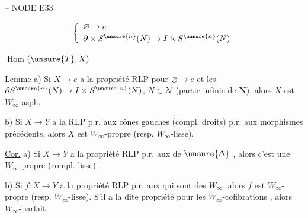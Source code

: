  -- NODE E33




\[
\left\{\begin{array}{l}
\varnothing\to e\\[2pt]
\partial\times S^{\unsure{n}}(N)\to I\times S^{\unsure{n}}(N)
\end{array}\right.
\]

\uline{$\operatorname{Hom}$}$(\unsure{T},X)$

\uline{Lemme} a) Si $X\to e$ a la propriété RLP  pour $\varnothing\to e$ \uline{et} les $\partial S^{\unsure{n}}(N)\to I\times S^{\unsure{n}}(N)$, $N\in\mathcal N$ (partie infinie de $\mathbf N$), alors $X$ est $W_\infty$-asph.

b) Si $X\to Y$ a la RLP p.r. aux cônes gauches (compl. droits) p.r. aux morphismes précédents, alors $X$ est $W_\infty$-propre (resp. $W_\infty$-lisse).

\uline{Cor.} a) Si $X\to Y$ a la propriété RLP p.r. aux  de $\unsure{\Delta}$    , alors c'est une  $W_\infty$-propre (compl. lisse) .

b) Si $f\colon X\to Y$ a la propriété RLP p.r. aux     qui sont des $W_\infty$, alors $f$ est $W_\infty$-propre (resp. $W_\infty$-lisse).
S'il a la dite propriété pour les $W_\infty$-cofibrations  , alors  $W_\infty$-parfait.



